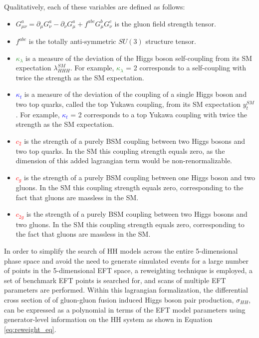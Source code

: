 Qualitatively, each of these variables are defined as follows:

\begin{itemize} \label{EFT_parameters_description}
  \item $G^a_{\mu \nu} = \partial_{\mu} G_{\nu}^a - \partial_{\nu} G_{\mu}^a + f^{abc}  G_{\mu}^b G_{\nu}^c$ is the gluon field strength tensor.
  \item $f^{abc}$ is the totally anti-symmetric $SU(3)$ structure tensor.
  \item \textcolor{ForestGreen}{$\kappa_{\lambda}$} is a measure of the deviation of the Higgs boson self-coupling from its SM expectation $\lambda_{HHH}^{SM}$. For example, \textcolor{ForestGreen}{$\kappa_{\lambda}$} = 2 corresponds to a self-coupling with twice the strength as the SM expectation.
  \item \textcolor{blue}{$\kappa_{t}$} is a measure of the deviation of the coupling of a single Higgs boson and two top quarks, called the top Yukawa coupling, from its SM expectation $y_{t}^{SM}$. For example, \textcolor{blue}{$\kappa_{t}$} = 2 corresponds to a top Yukawa coupling with twice the strength as the SM expectation.
  \item \textcolor{red}{$c_{2}$} is the strength of a purely BSM coupling between two Higgs bosons and two top quarks. In the SM this coupling strength equals zero, as the dimension of this added lagrangian term would be non-renormalizable.
  \item \textcolor{red}{$c_{g}$} is the strength of a purely BSM coupling between one Higgs boson and two gluons. In the SM this coupling strength equals zero, corresponding to the fact that gluons are massless in the SM.
  \item \textcolor{red}{$c_{2g}$} is the strength of a purely BSM coupling between two Higgs bosons and two gluons. In the SM this coupling strength equals zero, corresponding to the fact that gluons are massless in the SM.
\end{itemize}

In order to simplify the search of HH models across the entire 5-dimensional phase space and avoid the need to generate simulated events for a large number of points in the 5-dimensional EFT space, a reweighting technique is employed, a set of benchmark EFT points is searched for, and scans of multiple EFT parameters are performed. Within this lagrangian formalization, the differential cross section of of gluon-gluon fusion induced Higgs boson pair production, $\sigma_{HH}$, can be expressed as a polynomial in terms of the EFT model parameters using generator-level information on the HH system as shown in Equation \ref{eq:reweight_eq}.


